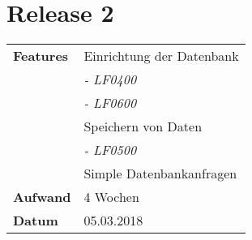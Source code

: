 
\section*{Release 2}
\label{sec:release_2}

\begin{tabular}{p{5cm} p{9cm}}
    \textbf{Features} & Einrichtung der Datenbank \\
    & \hspace{8pt} \textit{\footnotesize - LF0400} \\
    & \hspace{8pt} \textit{\footnotesize - LF0600} \\
    & Speichern von Daten \\
    & \hspace{8pt} \textit{\footnotesize - LF0500} \\
    & Simple Datenbankanfragen  \\
    \hline
    \textbf{Aufwand} & 4 Wochen\\
    \hline
    \textbf{Datum} & 05.03.2018
\end{tabular}
